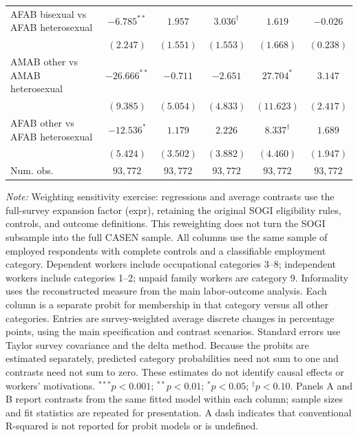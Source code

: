 \begin{table}[htpb!]
{\begin{tabular}{l c c c c c}
AFAB bisexual vs AFAB heterosexual & $-6.785^{**}$ & $1.957$ & $3.036^{\dagger}$ & $1.619$ & $-0.026$ \\
 & $(2.247)$ & $(1.551)$ & $(1.553)$ & $(1.668)$ & $(0.238)$ \\
AMAB other vs AMAB heterosexual & $-26.666^{**}$ & $-0.711$ & $-2.651$ & $27.704^{*}$ & $3.147$ \\
 & $(9.385)$ & $(5.054)$ & $(4.833)$ & $(11.623)$ & $(2.417)$ \\
AFAB other vs AFAB heterosexual & $-12.536^{*}$ & $1.179$ & $2.226$ & $8.337^{\dagger}$ & $1.689$ \\
 & $(5.424)$ & $(3.502)$ & $(3.882)$ & $(4.460)$ & $(1.947)$ \\
\hline
Num. obs. & $93,772$ & $93,772$ & $93,772$ & $93,772$ & $93,772$ \\
\hline
\end{tabular}%
}
\par\vspace{1ex}
\begin{minipage}{\textwidth}\footnotesize\raggedright
\textit{Note:} Weighting sensitivity exercise: regressions and average contrasts use the full-survey expansion factor (expr), retaining the original SOGI eligibility rules, controls, and outcome definitions. This reweighting does not turn the SOGI subsample into the full CASEN sample. All columns use the same sample of employed respondents with complete controls and a classifiable employment category. Dependent workers include occupational categories 3--8; independent workers include categories 1--2; unpaid family workers are category 9. Informality uses the reconstructed measure from the main labor-outcome analysis. Each column is a separate probit for membership in that category versus all other categories. Entries are survey-weighted average discrete changes in percentage points, using the main specification and contrast scenarios. Standard errors use Taylor survey covariance and the delta method. Because the probits are estimated separately, predicted category probabilities need not sum to one and contrasts need not sum to zero. These estimates do not identify causal effects or workers' motivations. $^{***}p<0.001$; $^{**}p<0.01$; $^{*}p<0.05$; $^{\dagger}p<0.10$. Panels A and B report contrasts from the same fitted model within each column; sample sizes and fit statistics are repeated for presentation. A dash indicates that conventional R-squared is not reported for probit models or is undefined.
\end{minipage}
\end{table}
